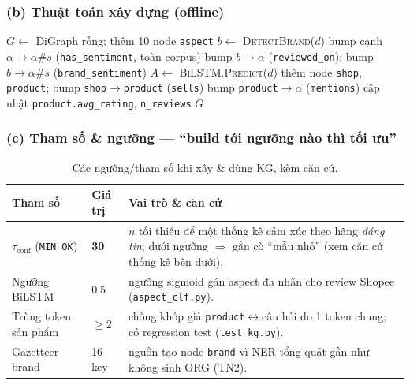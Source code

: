 \documentclass[12pt,a4paper]{article}
\begin{document}
\subsubsection*{(b) Thuật toán xây dựng (offline)}
\begin{algorithm}[H]
\caption{BuildKG --- dựng Knowledge Graph từ review (hiện thực \texttt{core/kg.py})}
\begin{algorithmic}[1]
\State $G \gets$ DiGraph rỗng; thêm 10 node \texttt{aspect}
  \State $b \gets$ \textsc{DetectBrand}($d$) 
    \State bump cạnh $\alpha \!\to\! \alpha\#s$ \quad(\texttt{has\_sentiment}, toàn corpus)
      \State bump $b \!\to\! \alpha$ (\texttt{reviewed\_on}); \; bump $b \!\to\! \alpha\#s$ (\texttt{brand\_sentiment})
    \EndIf
  \EndFor
\EndFor
{}
  \State $A \gets$ \textsc{BiLSTM.Predict}($d$) 
  \State thêm node \texttt{shop}, \texttt{product}; bump \texttt{shop}$\to$\texttt{product} (\texttt{sells})
   bump \texttt{product}$\to\alpha$ (\texttt{mentions}) \EndFor
  \State cập nhật \texttt{product.avg\_rating}, \texttt{n\_reviews}
\EndFor
\State \Return $G$ 
\end{algorithmic}
\end{algorithm}

\subsubsection*{(c) Tham số \& ngưỡng --- ``build tới ngưỡng nào thì tối ưu''}
\begin{table}[H]
\centering\small
\caption{Các ngưỡng/tham số khi xây \& dùng KG, kèm căn cứ.}
\begin{tabular}{p{3.1cm}p{1.5cm}p{7.4cm}}
\toprule
\textbf{Tham số} & \textbf{Giá trị} & \textbf{Vai trò \& căn cứ} \\
\midrule
$\tau_{\text{conf}}$ (\texttt{MIN\_OK}) & \textbf{30} & $n$ tối thiểu để một thống kê cảm xúc theo hãng \textit{đáng tin}; dưới ngưỡng $\Rightarrow$ gắn cờ ``mẫu nhỏ'' (xem căn cứ thống kê bên dưới). \\
Ngưỡng BiLSTM & 0.5 & ngưỡng sigmoid gán aspect đa nhãn cho review Shopee (\texttt{aspect\_clf.py}). \\
Trùng token sản phẩm & $\geq$2 & chống khớp giả \texttt{product}$\leftrightarrow$câu hỏi do 1 token chung; có regression test (\texttt{test\_kg.py}). \\
Gazetteer brand & 16 key & nguồn tạo node \texttt{brand} vì NER tổng quát gần như không sinh ORG (TN2). \\
\bottomrule
\end{tabular}
\end{table}
\end{document}
